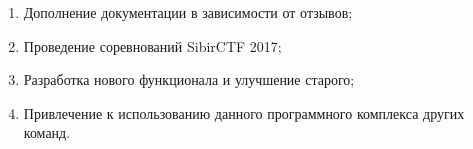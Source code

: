 \begin{enumerate}
\item Дополнение документации в зависимости от отзывов;
\item Проведение соревнований SibirCTF 2017;
\item Разработка нового функционала и улучшение старого;
\item Привлечение к использованию данного программного комплекса других команд.
\end{enumerate}